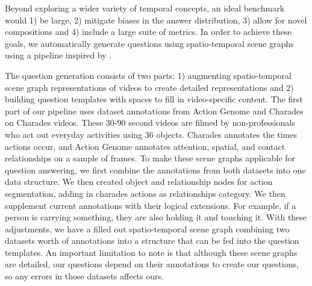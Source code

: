 \documentclass[10pt,twocolumn,letterpaper]{article}
\newcommand{\mgm}[1]{{\color{cyan}{mgm: #1}}}
\begin{document}
Beyond exploring a wider variety of temporal concepts, an ideal benchmark would 1) be large, 2) mitigate biases in the answer distribution, 3) allow for novel compositions and 4) include a large suite of metrics. In order to achieve these goals, we automatically generate questions using spatio-temporal scene graphs using a pipeline inspired by \cite{hudson2019gqa}.

The question generation consists of two parts: 1) augmenting spatio-temporal scene graph representations of videos to create detailed representations and 2) building question templates with spaces to fill in video-specific content. The first part of our pipeline uses dataset annotations from Action Genome and Charades \cite{ji2020action, sigurdsson2016hollywood} on Charades videos. These 30-90 second videos are filmed by non-professionals who act out everyday activities using 36 objects. Charades annotates the times actions occur, and Action Genome annotates attention, spatial, and contact relationships on a sample of frames. \mgm{figure} To make these scene graphs applicable for question answering, we first combine the annotations from both datasets into one data structure. We then created object and relationship nodes for action segmentation, adding in charades actions as relationships category. We then supplement current annotations with their logical extensions. For example, if a person is carrying something, they are also holding it and touching it. With these adjustments, we have a filled out spatio-temporal scene graph combining two datasets worth of annotations into a structure that can be fed into the question templates. An important limitation to note is that although these scene graphs are detailed, our questions depend on their annotations to create our questions, so any errors in those datasets affects ours.
    
\end{document}
